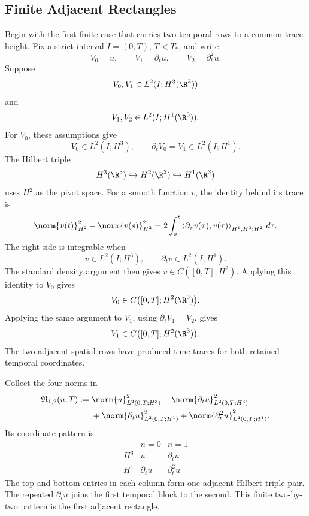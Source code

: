 
\subsection{Finite Adjacent Rectangles}\label{sub:FiniteAdjacentRectangles}

Begin with the first finite case that carries two temporal rows to a common trace height.
Fix a strict interval \(I=(0,T)\), \(T<T_*\), and write
\[
  V_0=u,
  \qquad
  V_1=\partial_tu,
  \qquad
  V_2=\partial_t^2u.
\]
Suppose
\[
  V_0,V_1
  \in
  L^2(I;H^3(\R^3))
\]
and
\[
  V_1,V_2
  \in
  L^2(I;H^1(\R^3)).
\]
For \(V_0\), these assumptions give
\[
  V_0\in L^2(I;H^3),
  \qquad
  \partial_tV_0=V_1\in L^2(I;H^1).
\]
The Hilbert triple
\[
  H^3(\R^3)
  \hookrightarrow
  H^2(\R^3)
  \hookrightarrow
  H^1(\R^3)
\]
uses \(H^2\) as the pivot space.
For a smooth function \(v\), the identity behind its trace is
\[
  \norm{v(t)}_{H^2}^2
  -
  \norm{v(s)}_{H^2}^2
  =
  2\int_s^t
  \left\langle
    \partial_\tau v(\tau),
    v(\tau)
  \right\rangle_{H^1,H^3;H^2}
  \,d\tau.
\]
The right side is integrable when
\[
  v\in L^2(I;H^3),
  \qquad
  \partial_tv\in L^2(I;H^1).
\]
The standard density argument then gives \(v\in C([0,T];H^2)\).
Applying this identity to \(V_0\) gives
\[
  V_0\in C\bigl([0,T];H^2(\R^3)\bigr).
\]
Applying the same argument to \(V_1\), using \(\partial_tV_1=V_2\), gives
\[
  V_1\in C\bigl([0,T];H^2(\R^3)\bigr).
\]
The two adjacent spatial rows have produced time traces for both retained temporal coordinates.

Collect the four norms in
\begin{align*}
  \mathfrak R_{1,2}(u;T)
  :={}&
  \norm{u}_{L^2(0,T;H^3)}^2
  +
  \norm{\partial_tu}_{L^2(0,T;H^3)}^2
  \\
  &+
  \norm{\partial_tu}_{L^2(0,T;H^1)}^2
  +
  \norm{\partial_t^2u}_{L^2(0,T;H^1)}^2.
\end{align*}
Its coordinate pattern is
\[
  \begin{array}{c|cc}
    & n=0 & n=1
    \\
    \hline
    H^3
    & u & \partial_tu
    \\
    H^1
    & \partial_tu & \partial_t^2u
  \end{array}
\]
The top and bottom entries in each column form one adjacent Hilbert-triple pair.
The repeated \(\partial_tu\) joins the first temporal block to the second.
This finite two-by-two pattern is the first adjacent rectangle.

